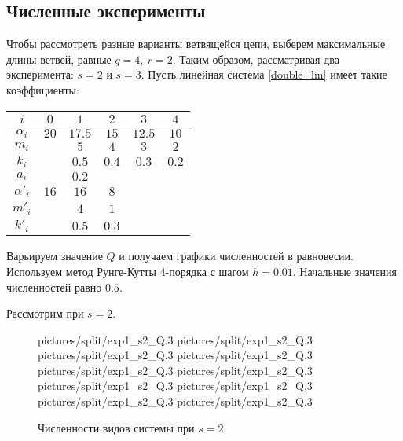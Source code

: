 \subsection{Численные эксперименты}
Чтобы рассмотреть разные варианты ветвящейся цепи, выберем максимальные длины ветвей, равные \(q = 4, ~ r=2\). Таким образом, рассматривая два эксперимента: \(s=2\) и \(s=3\). Пусть линейная система \eqref{double_lin} имеет такие коэффициенты:

\begin{center}
    \begin{tabular}{|c|c|c|c|c|c|}
        \hline
        \(i\)        & \(0\) & \(1\) & \(2\) & \(3\) & \(4\) \\ \hline
        \(\alpha_i\)& \(20\) & \(17.5\) & \(15\) & \(12.5\) & \(10\) \\ \hline
        \(m_i\) &            & \(5\) & \(4\) & \(3\) & \(2\) \\ \hline
        \(k_i\) &            & \(0.5\) & \(0.4\) & \(0.3\) & \(0.2\) \\ \hline
        \(a_i\) &            & \(0.2\) &  &  &  \\ \hline \hline

        \(\alpha'_i\)& \(16\) & \(16\) & \(8\) &  &  \\ \hline
        \(m'_i\) &            & \(4\) & \(1\) &  &  \\ \hline
        \(k'_i\) &            & \(0.5\) & \(0.3\) &  &  \\ \hline
    \end{tabular}
\end{center}

Варьируем значение \(Q\) и получаем графики численностей в равновесии. Используем метод Рунге-Кутты \(4\)-порядка с шагом \(h = 0.01\). Начальные значения численностей равно \(0.5\). 

Рассмотрим при \(s=2\).
\begin{figure}[H]
    \centering
       {pictures/split/exp1_s2_Q}{.3}
      {pictures/split/exp1_s2_Q}{.3}
      {pictures/split/exp1_s2_Q}{.3}
      {pictures/split/exp1_s2_Q}{.3}
      {pictures/split/exp1_s2_Q}{.3}
      {pictures/split/exp1_s2_Q}{.3}
      {pictures/split/exp1_s2_Q}{.3}
      {pictures/split/exp1_s2_Q}{.3}
      {pictures/split/exp1_s2_Q}{.3}
     {pictures/split/exp1_s2_Q}{.3}
\caption{Численности видов системы при \(s=2\).}  \label{fig:split_exp1_s2}
\end{figure}


